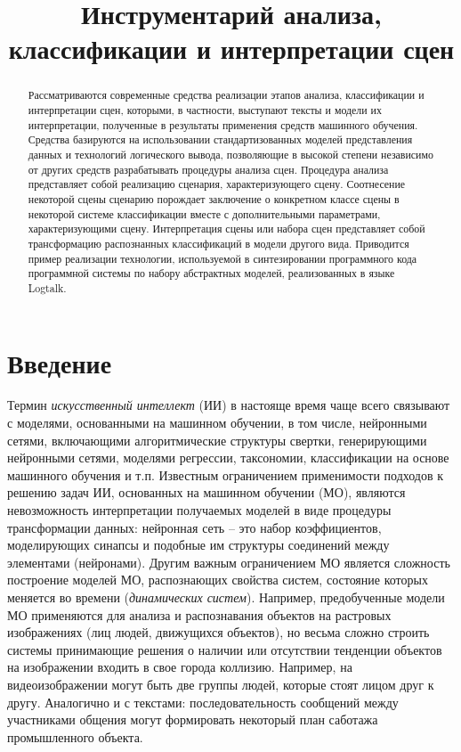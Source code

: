 \documentclass[12pt]{article}
\begin{document}

\title{Инструментарий анализа, классификации и интерпретации
сцен}

\maketitle

\begin{abstract}
  Рассматриваются современные средства реализации этапов анализа,
  классификации и интерпретации сцен, которыми, в частности, выступают
  тексты и модели их интерпретации, полученные в результаты применения
  средств машинного обучения. Средства базируются на использовании
  стандартизованных моделей представления данных и технологий логического
  вывода, позволяющие в высокой степени независимо от других средств
  разрабатывать процедуры анализа сцен. Процедура анализа представляет
  собой реализацию сценария, характеризующего сцену. Соотнесение некоторой
  сцены сценарию порождает заключение о конкретном классе сцены в
  некоторой системе классификации вместе с дополнительными параметрами,
  характеризующими сцену. Интерпретация сцены или набора сцен представляет
  собой трансформацию распознанных классификаций в модели другого вида.
  Приводится пример реализации технологии, используемой в синтезировании
  программного кода программной системы по набору абстрактных моделей,
  реализованных в языке Logtalk.
\end{abstract}

\section*{Введение}

Термин \emph{искусственный интеллект} (ИИ) в настояще время чаще всего
связывают с моделями, основанными на машинном обучении, в том числе,
нейронными сетями, включающими алгоритмические структуры свертки,
генерирующими нейронными сетями, моделями регрессии, таксономии,
классификации на основе машинного обучения и т.п. Известным ограничением
применимости подходов к решению задач ИИ, основанных на машинном
обучении (МО), являются невозможность интерпретации получаемых моделей в
виде процедуры трансформации данных: нейронная сеть -- это набор
коэффициентов, моделирующих синапсы и подобные им структуры соединений
между элементами (нейронами). Другим важным ограничением МО является
сложность построение моделей МО, распознающих свойства систем, состояние
которых меняется во времени (\emph{динамических систем}). Например,
предобученные модели МО применяются для анализа и распознавания объектов
на растровых изображениях (лиц людей, движущихся объектов), но весьма
сложно строить системы принимающие решения о наличии или отсутствии
тенденции объектов на изображении входить в свое города коллизию.
Например, на видеоизображении могут быть две группы людей, которые стоят
лицом друг к другу. Аналогично и с текстами: последовательность
сообщений между участниками общения могут формировать некоторый план
саботажа промышленного объекта.
\end{document}
